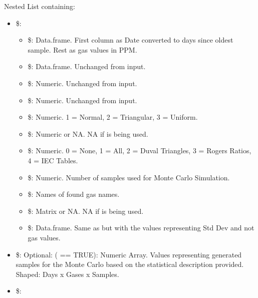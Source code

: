 \documentclass[a4paper]{book}
\begin{document}
%
\begin{Value}
Nested List containing:
\begin{itemize}

\item{} \$:
\begin{itemize}

\item{} \$: Data.frame. First column as Date converted to days since oldest sample. Rest as gas values in PPM.
\item{} \$: Data.frame. Unchanged from input.
\item{} \$: Numeric. Unchanged from input.
\item{} \$: Numeric. Unchanged from input.
\item{} \$: Numeric. 1 = Normal, 2 = Triangular, 3 = Uniform.
\item{} \$: Numeric or NA. NA if  is being used.
\item{} \$: Numeric. 0 = None, 1 = All, 2 = Duval Triangles, 3 = Rogers Ratios, 4 = IEC Tables.
\item{} \$: Numeric. Number of samples used for Monte Carlo Simulation.
\item{} \$: Names of found gas names.
\item{} \$: Matrix or NA. NA if  is being used.
\item{} \$: Data.frame. Same as  but with the values representing Std Dev and not gas values.

\end{itemize}

\item{} \$: Optional: ( == TRUE): Numeric Array. Values representing generated samples for the Monte Carlo based on the statistical description provided. Shaped: Days x Gases x Samples.
\item{} \$:
\begin{itemize}


\end{itemize}
\end{itemize}
\end{Value}
\end{document}
